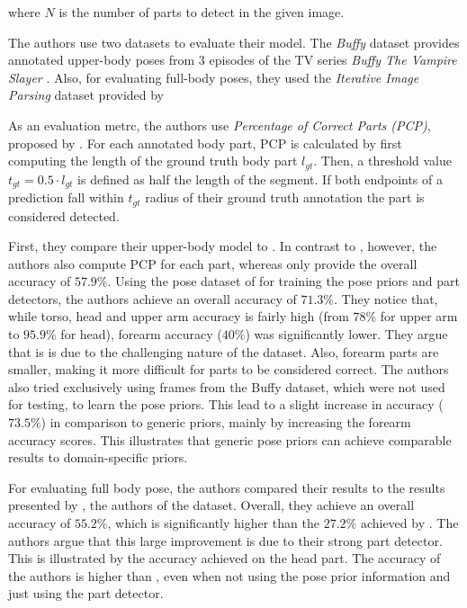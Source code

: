 where $N$ is the number of parts to detect in the given image.

\label{sec:andriluka-eval}
The authors use two datasets to evaluate their model.
The \textit{Buffy} dataset provides annotated upper-body poses from $3$ episodes of the TV series \textit{Buffy The Vampire Slayer} \cite{ferrari_progressive_2008}.
Also, for evaluating full-body poses, they used the \textit{Iterative Image Parsing} dataset provided by \cite{ramanan_learning_2007}

As an evaluation metrc, the authors use \textit{Percentage of Correct Parts (PCP)}, proposed by \cite{ferrari_progressive_2008}.
For each annotated body part, PCP is calculated by first computing the length of the ground truth body part $l_{gt}$.
Then, a threshold value $t_{gt} = 0.5 \cdot l_{gt}$ is defined as half the length of the segment.
If both endpoints of a prediction fall within $t_{gt}$ radius of their ground truth annotation the part is considered detected.

First, they compare their upper-body model to \cite{ferrari_progressive_2008}.
In contrast to \cite{ferrari_progressive_2008}, however, the authors also compute PCP for each part, whereas \cite{ferrari_progressive_2008} only provide the overall accuracy of $57.9\%$.
Using the pose dataset of \cite{ramanan_learning_2007} for training the pose priors and part detectors, the authors achieve an overall accuracy of $71.3\%$.
They notice that, while torso, head and upper arm accuracy is fairly high (from $78\%$ for upper arm to $95.9\%$ for head), forearm accuracy ($40\%$) was significantly lower.
They argue that is is due to the challenging nature of the dataset.
Also, forearm parts are smaller, making it more difficult for parts to be considered correct.
The authors also tried exclusively using frames from the Buffy dataset, which were not used for testing, to learn the pose priors.
This lead to a slight increase in accuracy ($73.5\%$) in comparison to generic priors, mainly by increasing the forearm accuracy scores.
This illustrates that generic pose priors can achieve comparable results to domain-specific priors.

For evaluating full body pose, the authors compared their results to the results presented by \cite{ramanan_learning_2007}, the authors of the dataset.
Overall, they achieve an overall accuracy of $55.2\%$, which is significantly higher than the $27.2\%$ achieved by \cite{ramanan_learning_2007}.
The authors argue that this large improvement is due to their strong part detector.
This is illustrated by the accuracy achieved on the head part.
The accuracy of the authors is higher than \cite{ramanan_learning_2007}, even when not using the pose prior information and just using the part detector.

